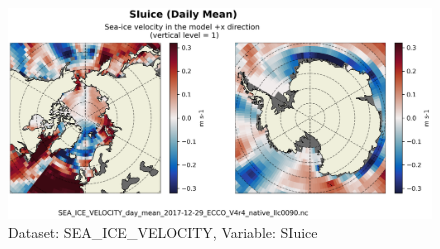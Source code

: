 \begin{figure}[H]
\centering
\includegraphics[scale=0.55]{../images/plots/native_plots/Sea-Ice_Velocity/SIuice.png}
\caption{Dataset: SEA\_ICE\_VELOCITY, Variable: SIuice}
\label{tab:table-SEA_ICE_VELOCITY_SIuice-Plot}
\end{figure}
\newpage
\pagebreak
